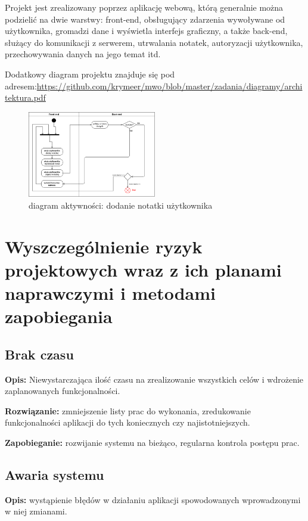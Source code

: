 \documentclass[a4paper,11pt]{article}
\begin{document}
  Projekt jest zrealizowany poprzez aplikację webową, którą generalnie można podzielić na dwie warstwy: front-end, obsługujący zdarzenia wywoływane od użytkownika, gromadzi dane i wyświetla interfejs graficzny, a także back-end, służący do komunikacji z serwerem, utrwalania notatek, autoryzacji użytkownika, przechowywania danych na jego temat itd.\newline

  \noindent Dodatkowy diagram projektu znajduje się pod adresem:\newline\url{https://github.com/krymeer/mwo/blob/master/zadania/diagramy/architektura.pdf}

  \begin{figure}[h!]
    \begin{center}
      \includegraphics[width=0.5\textwidth]{../diagramy/diagram_stanow_2.png}
    \end{center}
    \caption{diagram aktywności: dodanie notatki użytkownika}
  \end{figure}


  \section{Wyszczególnienie ryzyk projektowych wraz z ich planami naprawczymi i metodami zapobiegania}
  
    \subsection{Brak czasu}
      \noindent\textbf{Opis:} Niewystarczająca ilość czasu na zrealizowanie wszystkich celów i wdrożenie zaplanowanych funkcjonalności.
      
      \noindent\textbf{Rozwiązanie:} zmniejszenie listy prac do wykonania, zredukowanie funkcjonalności aplikacji do tych koniecznych czy najistotniejszych.
      
      \noindent\textbf{Zapobieganie:} rozwijanie systemu na bieżąco, regularna kontrola postępu prac.

    \subsection{Awaria systemu}
      \noindent\textbf{Opis:} wystąpienie błędów w działaniu aplikacji spowodowanych wprowadzonymi w niej zmianami.
      
\end{document}
